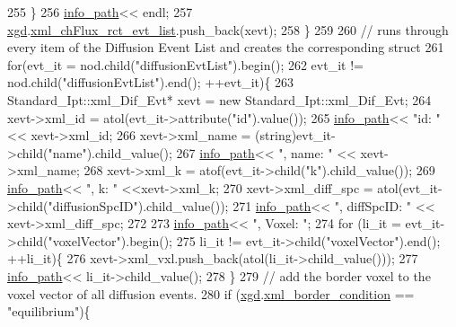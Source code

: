 \begin{DoxyCode}
255         \}
256         \hyperlink{classnw_1_1_standard___ipt_a7b8147e8b90f4adabb30e1b3fd8c40b8}{info\_path}<< endl;
257         \hyperlink{classnw_1_1_standard___ipt_aad5708d9729b7a5f660dade1927b4d4e}{xgd}.\hyperlink{structnw_1_1_standard___ipt_1_1xml__gen__data_ae0479559e90fe38932ac604852a1541f}{xml\_chFlux\_rct\_evt\_list}.push\_back(xevt);
258     \}
259 
260 \textcolor{comment}{//  runs through every item of the Diffusion Event List and creates the corresponding struct}
261     \textcolor{keywordflow}{for}(evt\_it = nod.child(\textcolor{stringliteral}{"diffusionEvtList"}).begin();
262             evt\_it != nod.child(\textcolor{stringliteral}{"diffusionEvtList"}).end(); ++evt\_it)\{
263         Standard\_Ipt::xml\_Dif\_Evt* xevt = \textcolor{keyword}{new} Standard\_Ipt::xml\_Dif\_Evt;
264         xevt->xml\_id = atol(evt\_it->attribute(\textcolor{stringliteral}{"id"}).value());
265         \hyperlink{classnw_1_1_standard___ipt_a7b8147e8b90f4adabb30e1b3fd8c40b8}{info\_path}<< \textcolor{stringliteral}{"id: "} << xevt->xml\_id;
266         xevt->xml\_name = (string)evt\_it->child(\textcolor{stringliteral}{"name"}).child\_value();
267         \hyperlink{classnw_1_1_standard___ipt_a7b8147e8b90f4adabb30e1b3fd8c40b8}{info\_path}<< \textcolor{stringliteral}{", name: "} << xevt->xml\_name;
268         xevt->xml\_k = atof(evt\_it->child(\textcolor{stringliteral}{"k"}).child\_value());
269         \hyperlink{classnw_1_1_standard___ipt_a7b8147e8b90f4adabb30e1b3fd8c40b8}{info\_path}<< \textcolor{stringliteral}{", k: "} <<xevt->xml\_k;
270         xevt->xml\_diff\_spc = atol(evt\_it->child(\textcolor{stringliteral}{"diffusionSpcID"}).child\_value());
271         \hyperlink{classnw_1_1_standard___ipt_a7b8147e8b90f4adabb30e1b3fd8c40b8}{info\_path}<< \textcolor{stringliteral}{", diffSpcID: "} << xevt->xml\_diff\_spc;
272 
273         \hyperlink{classnw_1_1_standard___ipt_a7b8147e8b90f4adabb30e1b3fd8c40b8}{info\_path}<< \textcolor{stringliteral}{", Voxel: "};
274         \textcolor{keywordflow}{for} (li\_it = evt\_it->child(\textcolor{stringliteral}{"voxelVector"}).begin();
275                 li\_it != evt\_it->child(\textcolor{stringliteral}{"voxelVector"}).end(); ++li\_it)\{
276             xevt->xml\_vxl.push\_back(atol(li\_it->child\_value()));
277             \hyperlink{classnw_1_1_standard___ipt_a7b8147e8b90f4adabb30e1b3fd8c40b8}{info\_path}<< li\_it->child\_value();
278         \}
279 \textcolor{comment}{//      add the border voxel to the voxel vector of all diffusion events.}
280         \textcolor{keywordflow}{if} (\hyperlink{classnw_1_1_standard___ipt_aad5708d9729b7a5f660dade1927b4d4e}{xgd}.\hyperlink{structnw_1_1_standard___ipt_1_1xml__gen__data_adc59bb5516c7b0c34463e5c1b446bf6a}{xml\_border\_condition} == \textcolor{stringliteral}{"equilibrium"})\{

\end{DoxyCode}
